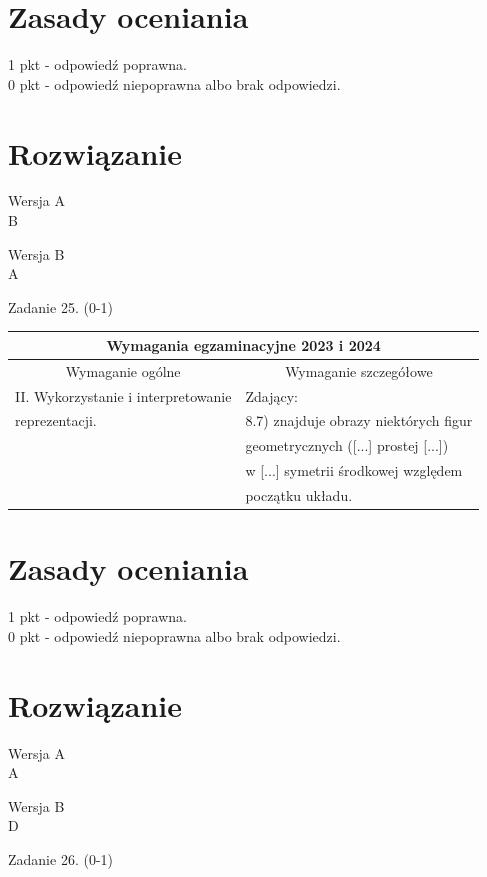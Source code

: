 \documentclass[10pt]{article}
\begin{document}
\section*{Zasady oceniania}
1 pkt - odpowiedź poprawna.\\
0 pkt - odpowiedź niepoprawna albo brak odpowiedzi.

\section*{Rozwiązanie}
Wersja A\\
B

Wersja B\\
A

Zadanie 25. (0-1)

\begin{center}
\begin{tabular}{|l|l|}
\hline
\multicolumn{2}{|c|}{Wymagania egzaminacyjne 2023 i 2024} \\
\hline
\multicolumn{1}{|c|}{Wymaganie ogólne} & \multicolumn{1}{c|}{Wymaganie szczegółowe} \\
\hline
II. Wykorzystanie i interpretowanie & Zdający: \\
reprezentacji. & 8.7) znajduje obrazy niektórych figur \\
 & geometrycznych ([...] prostej [...]) \\
 & w [...] symetrii środkowej względem \\
 & początku układu. \\
\hline
\end{tabular}
\end{center}

\section*{Zasady oceniania}
1 pkt - odpowiedź poprawna.\\
0 pkt - odpowiedź niepoprawna albo brak odpowiedzi.

\section*{Rozwiązanie}
Wersja A\\
A

Wersja B\\
D

Zadanie 26. (0-1)
\end{document}
